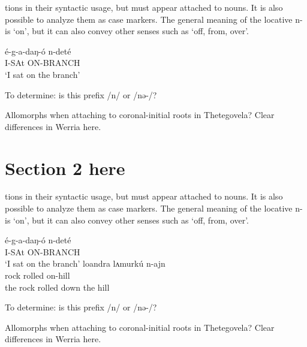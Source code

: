 tions in their syntactic usage, but must appear attached to nouns. It is also possible to analyze them as case markers. The general meaning of the locative n- is `on’, but it can also convey other senses such as `off, from, over’.  

	\ea \gll é-g-a-daŋ-ó n-deté		\\	
			I-SAt ON-BRANCH\\
		\glt `I sat on the branch'	
\z 

To determine: is this prefix /n/ or /nə-/?

Allomorphs when attaching to coronal-initial roots in Thetegovela? Clear differences in Werria here.


\section{Section 2 here}

tions in their syntactic usage, but must appear attached to nouns. It is also possible to analyze them as case markers. The general meaning of the locative n- is `on’, but it can also convey other senses such as `off, from, over’.  

	\ea \gll é-g-a-daŋ-ó n-deté		\\	
			I-SAt ON-BRANCH\\
		\glt `I sat on the branch'	
	\ex \gll loandra lʌmurkú n-ajn		 \\
			rock rolled on-hill\\
		\glt the rock rolled down the hill
\z 

To determine: is this prefix /n/ or /nə-/?

Allomorphs when attaching to coronal-initial roots in Thetegovela? Clear differences in Werria here.

